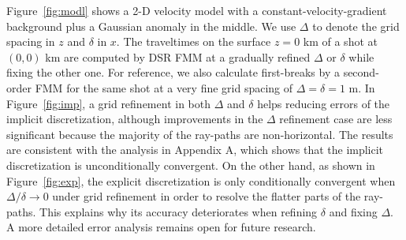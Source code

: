 Figure~\ref{fig:modl} shows a 2-D velocity model with a constant-velocity-gradient background plus a Gaussian 
anomaly in the middle. We use $\Delta$ to denote the grid spacing in $z$ and $\delta$ in $x$. The 
traveltimes on the surface $z = 0$ km of a shot at $(0,0)$ km are computed by DSR FMM at a gradually refined 
$\Delta$ or $\delta$ while fixing the other one. For reference, we also calculate first-breaks 
by a second-order FMM \cite[]{rickett,popovici} for the same shot at a very fine grid spacing of 
$\Delta = \delta = 1$ m. In Figure~\ref{fig:imp}, a 
grid refinement in both $\Delta$ and $\delta$ helps reducing errors of the implicit discretization, although 
improvements in the $\Delta$ refinement case are less significant because the majority of the ray-paths are 
non-horizontal. The results are consistent with the analysis in Appendix A, which shows 
that the implicit discretization is unconditionally convergent. On the other hand, as shown in 
Figure~\ref{fig:exp}, the explicit discretization is only conditionally convergent when 
$\Delta /\delta \rightarrow 0$ under grid refinement in order to resolve the flatter parts of the ray-paths. This 
explains why its accuracy deteriorates when refining $\delta$ and fixing $\Delta$. A more detailed error analysis 
remains open for future research.

